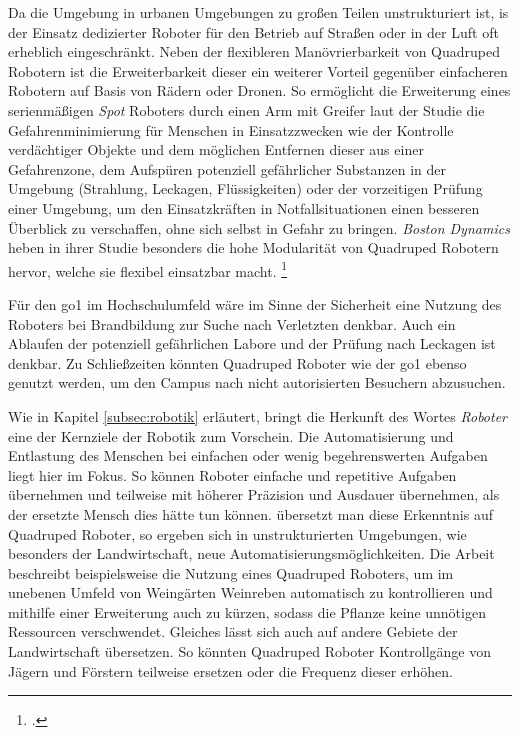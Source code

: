 Da die Umgebung in urbanen Umgebungen zu großen Teilen unstrukturiert ist, is der Einsatz dedizierter Roboter für den
Betrieb auf Straßen oder in der Luft oft erheblich eingeschränkt.
Neben der flexibleren Manövrierbarkeit von Quadruped Robotern ist die Erweiterbarkeit
dieser ein weiterer Vorteil gegenüber einfacheren Robotern auf Basis von Rädern oder Dronen.
So ermöglicht die Erweiterung eines serienmäßigen \emph{Spot} Roboters durch einen Arm mit Greifer laut der Studie
 die Gefahrenminimierung für Menschen in Einsatzzwecken wie der Kontrolle verdächtiger Objekte und dem
möglichen Entfernen dieser aus einer Gefahrenzone, dem Aufspüren potenziell gefährlicher Substanzen in der Umgebung (Strahlung, Leckagen, Flüssigkeiten)
oder der vorzeitigen Prüfung einer Umgebung, um den Einsatzkräften in Notfallsituationen einen besseren Überblick zu verschaffen,
ohne sich selbst in Gefahr zu bringen.
\emph{Boston Dynamics} heben in ihrer Studie besonders die hohe Modularität von Quadruped Robotern hervor, welche sie
flexibel einsatzbar macht.
\footcite{boston_dynamics_safety}

Für den \gls{go1} im Hochschulumfeld wäre im Sinne der Sicherheit eine Nutzung des Roboters bei Brandbildung zur Suche nach Verletzten denkbar.
Auch ein Ablaufen der potenziell gefährlichen Labore und der Prüfung nach Leckagen ist denkbar.
Zu Schließzeiten könnten Quadruped Roboter wie der \gls{go1} ebenso genutzt werden, um den Campus nach nicht autorisierten
Besuchern abzusuchen.


Wie in Kapitel \ref{subsec:robotik} erläutert, bringt die Herkunft des Wortes \emph{Roboter} eine der Kernziele der Robotik zum Vorschein.
Die Automatisierung und Entlastung des Menschen bei einfachen oder wenig begehrenswerten Aufgaben liegt hier im Fokus.
So können Roboter einfache und repetitive Aufgaben übernehmen und teilweise mit höherer Präzision und Ausdauer übernehmen,
als der ersetzte Mensch dies hätte tun können.
übersetzt man diese Erkenntnis auf Quadruped Roboter, so ergeben sich in unstrukturierten Umgebungen, wie besonders der Landwirtschaft,
neue Automatisierungsmöglichkeiten.
Die Arbeit  beschreibt beispielsweise die Nutzung eines Quadruped Roboters, um im unebenen Umfeld
von Weingärten Weinreben automatisch zu kontrollieren und mithilfe einer Erweiterung auch zu kürzen, sodass die Pflanze
keine unnötigen Ressourcen verschwendet.
Gleiches lässt sich auch auf andere Gebiete der Landwirtschaft übersetzen.
So könnten Quadruped Roboter Kontrollgänge von Jägern und Förstern teilweise ersetzen oder die Frequenz dieser erhöhen.

